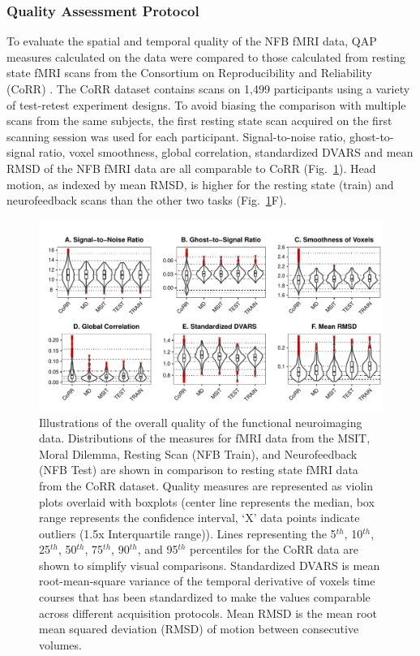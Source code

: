 \subsubsection{Quality Assessment Protocol}
To evaluate the spatial and temporal quality of the NFB fMRI data, QAP measures calculated on the data were compared to those calculated from resting state fMRI scans from the Consortium on Reproducibility and Reliability (CoRR) \cite{Zuo2014}. The CoRR dataset contains scans on 1,499 participants using a variety of test-retest experiment designs. To avoid biasing the comparison with multiple scans from the same subjects, the first resting state scan acquired on the first scanning session was used for each participant. Signal-to-noise ratio, ghost-to-signal ratio, voxel smoothness, global correlation, standardized DVARS and mean RMSD of the NFB fMRI data are all comparable to CoRR (Fig.~\ref{fig:qaplots}). Head motion, as indexed by mean RMSD, is higher for the resting state (train) and neurofeedback scans than the other two tasks (Fig.~\ref{fig:qaplots}F).

\begin{figure}[h!]
   \centering
   \includegraphics[width=.9\textwidth]{qaplots.pdf}
   \caption{Illustrations of the overall quality of the functional neuroimaging data. Distributions of the measures for fMRI data from the MSIT, Moral Dilemma, Resting Scan (NFB Train), and Neurofeedback (NFB Test) are shown in comparison to resting state fMRI data from the CoRR dataset. Quality measures are represented as violin plots overlaid with boxplots (center line represents the median, box range represents the confidence interval, ‘X’ data points indicate outliers (1.5x Interquartile range)). Lines representing the 5$^{th}$, 10$^{th}$, 25$^{th}$, 50$^{th}$, 75$^{th}$, 90$^{th}$, and 95$^{th}$ percentiles for the CoRR data are shown to simplify visual comparisons. Standardized DVARS is mean root-mean-square variance of the temporal derivative of voxels time courses that has been standardized to make the values comparable across different acquisition protocols. Mean RMSD is the mean root mean squared deviation (RMSD) of motion between consecutive volumes.}
   \label{fig:qaplots}
\end{figure}

